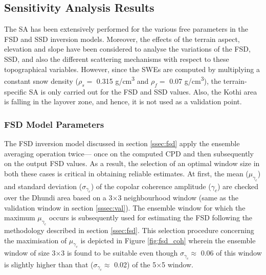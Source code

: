 \documentclass[review]{elsarticle}
\numberwithin{equation}{section}
\numberwithin{figure}{section}
\numberwithin{table}{section}
\begin{document}
\subsection{Sensitivity Analysis Results}
\label{ssec:sar}
The SA has been extensively performed for the various free parameters in the FSD and SSD inversion models. Moreover, the effects of the terrain aspect, elevation and slope have been considered to analyse the variations of the FSD, SSD, and also the different scattering mechanisms with respect to these topographical variables. However, since the SWEs are computed by multiplying a constant snow density ($\rho_s =$ 0.315 g/cm\textsuperscript{3} and $\rho_f =$ 0.07 g/cm\textsuperscript{3}), the terrain-specific SA is only carried out for the FSD and SSD values. Also, the Kothi area is falling in the layover zone, and hence, it is not used as a validation point.

\subsubsection{FSD Model Parameters}
\label{sssec:fsd_param}
The FSD inversion model discussed in section \ref{ssec:fsd} apply the ensemble averaging operation twice--- once on the computed CPD and then subsequently on the output FSD values. As a result, the selection of an optimal window size in both these cases is critical in obtaining reliable estimates. At first, the mean ($\mu_{\gamma_c}$) and standard deviation ($\sigma_{\gamma_c}$) of the copolar coherence amplitude ($\gamma_c$) are checked over the Dhundi area based on a 3$\times$3 neighbourhood window (same as the validation window in section \ref{sssec:val}). The ensemble window for which the maximum $\mu_{\gamma_c}$ occurs is subsequently used for estimating the FSD following the methodology described in section \ref{ssec:fsd}. This selection procedure concerning the maximisation of $\mu_{\gamma_c}$ is depicted in Figure \ref{fig:fsd_coh} wherein the ensemble window of size 3$\times$3 is found to be suitable even though $\sigma_{\gamma_c} \approx$ 0.06 of this window is slightly higher than that ($\sigma_{\gamma_c} \approx$ 0.02) of the 5$\times$5 window.
\end{document}
